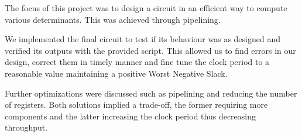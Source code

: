 \documentclass[12pt]{article}
\begin{document}
The focus of this project was to design a circuit in an efficient way to compute various determinants. This was achieved through pipelining.
  
We implemented the final circuit to test if its behaviour was as designed and verified its outputs with the provided script. This allowed us to
find errors in our design, correct them in timely manner and fine tune the clock period to a reasonable value maintaining a positive Worst Negative Slack.

Further optimizations were discussed such as pipelining and reducing the number of registers. Both solutions implied a trade-off, the former requiring more components and the latter increasing the clock period thus decreasing throughput.

\printbibliography
\end{document}
